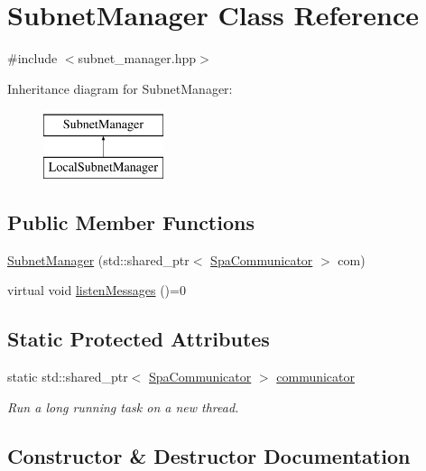 \hypertarget{classSubnetManager}{}\section{Subnet\+Manager Class Reference}
\label{classSubnetManager}


{\ttfamily \#include $<$subnet\+\_\+manager.\+hpp$>$}

Inheritance diagram for Subnet\+Manager\+:\begin{figure}[H]
\begin{center}
\leavevmode
\includegraphics[height=2.000000cm]{classSubnetManager}
\end{center}
\end{figure}
\subsection*{Public Member Functions}
\begin{DoxyCompactItemize}
\item 
\hyperlink{classSubnetManager_af60bbdf2417a03b1e2fb14a5b077597a}{Subnet\+Manager} (std\+::shared\+\_\+ptr$<$ \hyperlink{classSpaCommunicator}{Spa\+Communicator} $>$ com)
\item 
virtual void \hyperlink{classSubnetManager_a6aed1acaa5e9f18feb7667904675d119}{listen\+Messages} ()=0
\end{DoxyCompactItemize}
\subsection*{Static Protected Attributes}
\begin{DoxyCompactItemize}
\item 
static std\+::shared\+\_\+ptr$<$ \hyperlink{classSpaCommunicator}{Spa\+Communicator} $>$ \hyperlink{classSubnetManager_acb58a845a46fa4943cb2b9d4a56c9b0f}{communicator}
\begin{DoxyCompactList}\small\item\em Run a long running task on a new thread. \end{DoxyCompactList}\end{DoxyCompactItemize}


\subsection{Constructor \& Destructor Documentation}
\mbox{\label{classSubnetManager_af60bbdf2417a03b1e2fb14a5b077597a}} 
